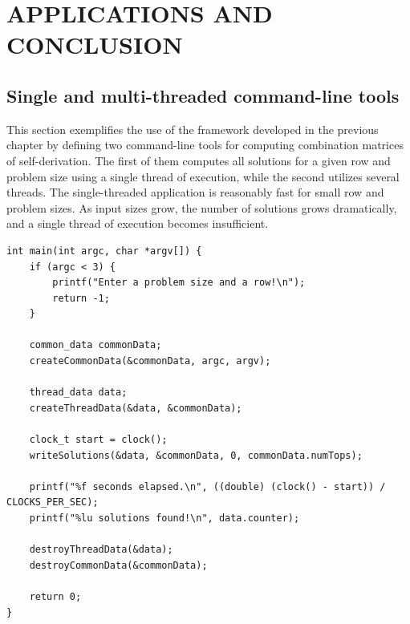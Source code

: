 \chapter{APPLICATIONS AND CONCLUSION}


\section{Single and multi-threaded command-line tools}

This section exemplifies the use of the framework developed in the previous chapter by defining two command-line tools for computing combination matrices of self-derivation. The first of them computes all solutions for a given row and problem size using a single thread of execution, while the second utilizes several threads. The single-threaded application is reasonably fast for small row and problem sizes. As input sizes grow, the number of solutions grows dramatically, and a single thread of execution becomes insufficient.

\begin{lstlisting}[caption={A single-threaded command line tool.},label={singleMain}]
int main(int argc, char *argv[]) {
    if (argc < 3) {
        printf("Enter a problem size and a row!\n");
        return -1;
    }

    common_data commonData;
    createCommonData(&commonData, argc, argv);

    thread_data data;
    createThreadData(&data, &commonData);

    clock_t start = clock();
    writeSolutions(&data, &commonData, 0, commonData.numTops);

    printf("%f seconds elapsed.\n", ((double) (clock() - start)) / CLOCKS_PER_SEC);
    printf("%lu solutions found!\n", data.counter);

    destroyThreadData(&data);
    destroyCommonData(&commonData);

    return 0;
}
\end{lstlisting}

